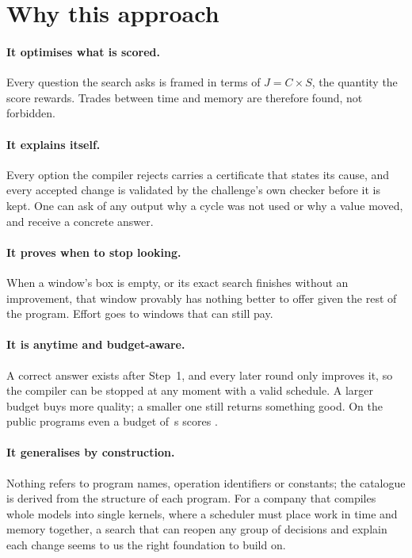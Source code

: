 \documentclass[11pt,a4paper]{article}
\begin{document}
\section{Why this approach}\label{sec:why}

\paragraph{It optimises what is scored.} Every question the search asks is framed
in terms of $J=C\times S$, the quantity the score rewards. Trades between time and
memory are therefore found, not forbidden.

\paragraph{It explains itself.} Every option the compiler rejects carries a
certificate that states its cause, and every accepted change is validated by the
challenge's own checker before it is kept. One can ask of any output why a cycle
was not used or why a value moved, and receive a concrete answer.

\paragraph{It proves when to stop looking.} When a window's box is empty, or its
exact search finishes without an improvement, that window provably has nothing
better to offer given the rest of the program. Effort goes to windows that can
still pay.

\paragraph{It is anytime and budget-aware.} A correct answer exists after Step~1,
and every later round only improves it, so the compiler can be stopped at any moment
with a valid schedule. A larger budget buys more quality; a smaller one still
returns something good. On the public programs even a budget of \,s scores
.

\paragraph{It generalises by construction.} Nothing refers to program names,
operation identifiers or constants; the catalogue is derived from the structure of
each program. For a company that compiles whole models into single kernels, where a
scheduler must place work in time and memory together, a search that can reopen
any group of decisions and explain each change seems to us the right foundation to
build on.
\end{document}

